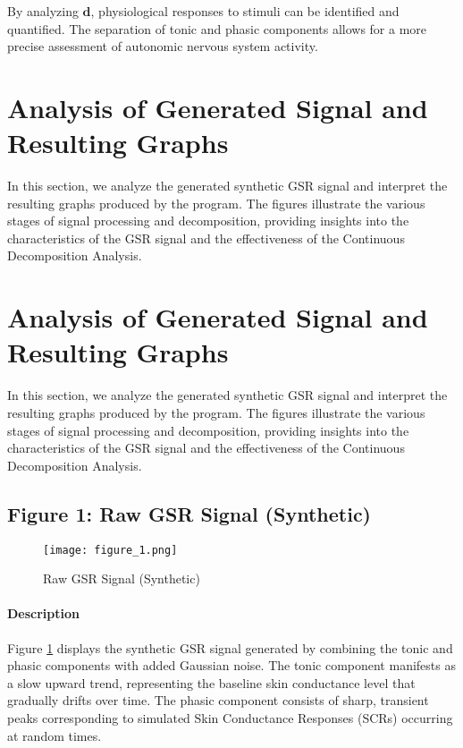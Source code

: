 \documentclass[twocolumn]{article}
\begin{document}
By analyzing \( \mathbf{d} \), physiological responses to stimuli can be identified and quantified. The separation of tonic and phasic components allows for a more precise assessment of autonomic nervous system activity.

\section*{Analysis of Generated Signal and Resulting Graphs}

In this section, we analyze the generated synthetic GSR signal and interpret the resulting graphs produced by the program. The figures illustrate the various stages of signal processing and decomposition, providing insights into the characteristics of the GSR signal and the effectiveness of the Continuous Decomposition Analysis.

\section*{Analysis of Generated Signal and Resulting Graphs}

In this section, we analyze the generated synthetic GSR signal and interpret the resulting graphs produced by the program. The figures illustrate the various stages of signal processing and decomposition, providing insights into the characteristics of the GSR signal and the effectiveness of the Continuous Decomposition Analysis.

\subsection*{Figure 1: Raw GSR Signal (Synthetic)}

\begin{figure}[H]
\centering
\texttt{[image: figure\_1.png]}
\caption{Raw GSR Signal (Synthetic)}
\label{fig:raw_gsr_signal}
\end{figure}

\paragraph{Description}

Figure \ref{fig:raw_gsr_signal} displays the synthetic GSR signal generated by combining the tonic and phasic components with added Gaussian noise. The tonic component manifests as a slow upward trend, representing the baseline skin conductance level that gradually drifts over time. The phasic component consists of sharp, transient peaks corresponding to simulated Skin Conductance Responses (SCRs) occurring at random times.
\end{document}
